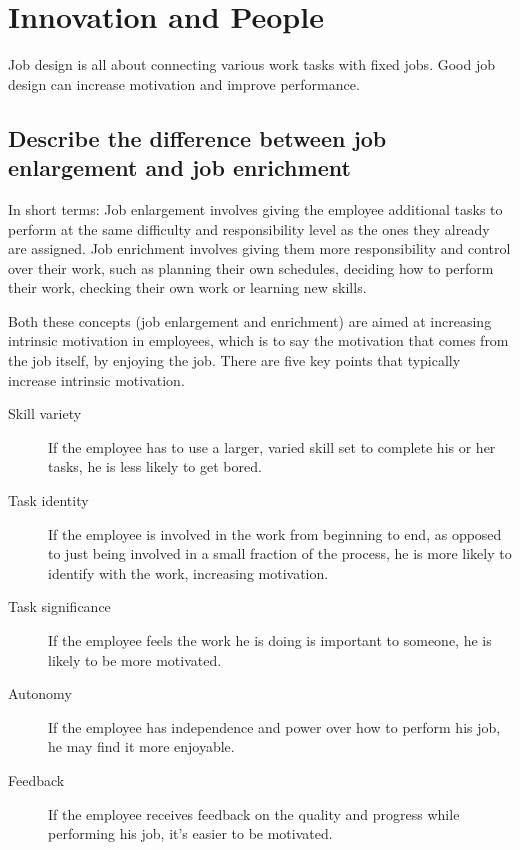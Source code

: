 \documentclass[a4paper]{article}
\begin{document}
    \section{Innovation and People} %
    Job design is all about connecting various work tasks with fixed jobs.
    Good job design can increase motivation and improve performance.


    \subsection*{Describe the difference between job enlargement and job enrichment}


    In short terms: Job enlargement involves giving the employee additional
    tasks to perform at the same difficulty and responsibility level as the
    ones they already are assigned. Job enrichment involves giving them more
    responsibility and control over their work, such as planning their own
    schedules, deciding how to perform their work, checking their own work or
    learning new skills.

    Both these concepts (job enlargement and enrichment) are aimed at
    increasing intrinsic motivation in employees, which is to say the
    motivation that comes from the job itself, by enjoying the job. There are
    five key points that typically increase intrinsic motivation.


    \begin{description}
        \item[Skill variety] If the employee has to use a larger, varied skill
        set to complete his or her tasks, he is less likely to get bored.

        \item[Task identity] If the employee is involved in the work from
        beginning to end, as opposed to just being involved in a small
        fraction of the process, he is more likely to identify with the work,
        increasing motivation.

        \item[Task significance] If the employee feels the work he is doing is
        important to someone, he is likely to be more motivated.

        \item[Autonomy] If the employee has independence and power over how to
        perform his job, he may find it more enjoyable.

        \item[Feedback] If the employee receives feedback on the quality and
        progress while performing his job, it's easier to be motivated.
    \end{description}
\end{document}
